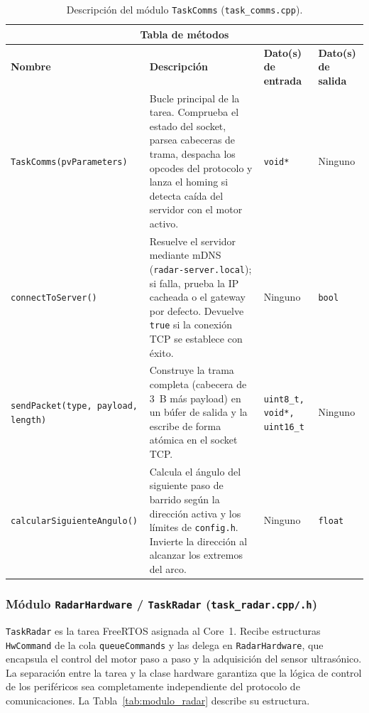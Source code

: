 \begin{table}[H]
{\begin{tabular}{|p{5cm}|p{9.5cm}|p{4cm}|p{3cm}|}
\hline
\multicolumn{4}{|c|}{\textbf{Tabla de métodos}} \\
\hline
\textbf{Nombre} & \textbf{Descripción} & \textbf{Dato(s) de entrada} & \textbf{Dato(s) de salida} \\
\hline
\texttt{TaskComms(pvParameters)} & Bucle principal de la tarea. Comprueba el estado del socket, parsea cabeceras de trama, despacha los opcodes del protocolo y lanza el homing si detecta caída del servidor con el motor activo. & \texttt{void*} & Ninguno \\
\hline
\texttt{connectToServer()} & Resuelve el servidor mediante mDNS (\texttt{radar-server.local}); si falla, prueba la IP cacheada o el gateway por defecto. Devuelve \texttt{true} si la conexión TCP se establece con éxito. & Ninguno & \texttt{bool} \\
\hline
\texttt{sendPacket(type, payload, length)} & Construye la trama completa (cabecera de 3~B más payload) en un búfer de salida y la escribe de forma atómica en el socket TCP. & \texttt{uint8\_t, void*, uint16\_t} & Ninguno \\
\hline
\texttt{calcularSiguienteAngulo()} & Calcula el ángulo del siguiente paso de barrido según la dirección activa y los límites de \texttt{config.h}. Invierte la dirección al alcanzar los extremos del arco. & Ninguno & \texttt{float} \\
\hline
\end{tabular}
}
\vspace{6pt}
\caption{Descripción del módulo \texttt{TaskComms} (\texttt{task\_comms.cpp}).}
\label{tab:modulo_comms}
\end{table}

\subsubsection*{Módulo \texttt{RadarHardware} / \texttt{TaskRadar} (\texttt{task\_radar.cpp/.h})}

\texttt{TaskRadar} es la tarea FreeRTOS asignada al Core~1. Recibe estructuras \texttt{HwCommand} de la cola \texttt{queueCommands} y las delega en \texttt{RadarHardware}, que encapsula el control del motor paso a paso y la adquisición del sensor ultrasónico. La separación entre la tarea y la clase hardware garantiza que la lógica de control de los periféricos sea completamente independiente del protocolo de comunicaciones. La Tabla~\ref{tab:modulo_radar} describe su estructura.

